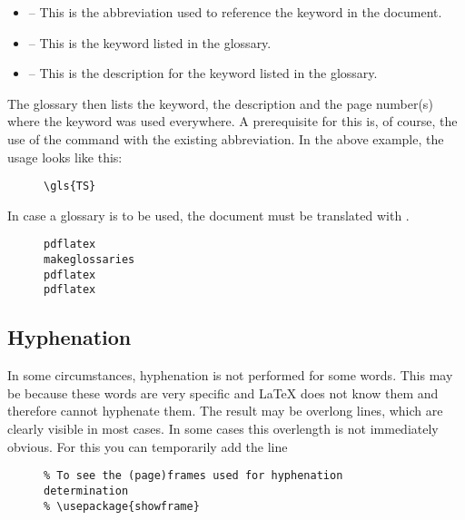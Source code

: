 \begin{itemize}
    \item {} -- This is the abbreviation used to reference the
          keyword in the document.
    \item {} -- This is the keyword listed in the
          glossary.
    \item {} -- This is the description for the
          keyword listed in the glossary.
\end{itemize}

The glossary then lists the keyword, the description and the page number(s)
where the keyword was used everywhere. A prerequisite for this is, of course,
the use of the command  with the
existing abbreviation. In the above example, the usage looks like this:

\begin{figure}[H]
    \small
    \centering
    \begin{BVerbatim}
\gls{TS}
    \end{BVerbatim}
\end{figure}

In case a glossary is to be used, the document must be translated with
.

\begin{figure}[H]
    \small
    \centering
    \begin{BVerbatim}
pdflatex
makeglossaries
pdflatex
pdflatex
    \end{BVerbatim}
\end{figure}

\subsection{Hyphenation}

In some circumstances, hyphenation is not performed for some words. This may
be because these words are very specific and \LaTeX{} does not know them and
therefore cannot hyphenate them. The result may be overlong lines, which are
clearly visible in most cases. In some cases this overlength is not
immediately obvious. For this you can temporarily add the line

\begin{figure}[H]
    \small
    \centering
    \begin{BVerbatim}
    \end{BVerbatim}
\end{figure}

